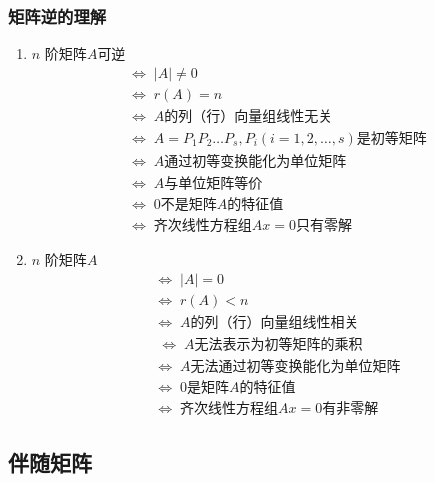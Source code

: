 \documentclass[./linear_algebra.tex]{subfiles}
\begin{document}
    \subsubsection{矩阵逆的理解}

    \begin{enumerate}
        \item $n$ 阶矩阵$A$可逆
        \begin{align*}
            &\Leftrightarrow\; |A| \neq 0  \\
            &\Leftrightarrow\; r(A) = n  \\
            &\Leftrightarrow\; A \text{的列（行）向量组线性无关}  \\
            &\Leftrightarrow\; A = P_{1}P_{2}\dots P_{s}, P_{i}(i = 1,2,\dots,s)\text{是初等矩阵}  \\
            &\Leftrightarrow\; A \text{通过初等变换能化为单位矩阵}  \\
            &\Leftrightarrow\; A \text{与单位矩阵等价}  \\
            &\Leftrightarrow\; 0\text{不是矩阵} A \text{的特征值}  \\
            &\Leftrightarrow\; \text{齐次线性方程组} Ax = 0 \text{只有零解}
        \end{align*}
        \item $n$ 阶矩阵$A${\color{red}{不可逆}}
        \begin{align*}
            &\Leftrightarrow\; |A| = 0  \\
            &\Leftrightarrow\; r(A) < n  \\
            &\Leftrightarrow\; A \text{的列（行）向量组线性相关}  \\
            &\;\Leftrightarrow\; A \text{无法表示为初等矩阵的乘积} \\
            &\Leftrightarrow\; A \text{无法通过初等变换能化为单位矩阵}  \\
            &\Leftrightarrow\; 0\text{是矩阵} A \text{的特征值}  \\
            &\Leftrightarrow\; \text{齐次线性方程组} Ax = 0 \text{有非零解}
        \end{align*}
    \end{enumerate}

    \subsection{伴随矩阵}
\end{document}
